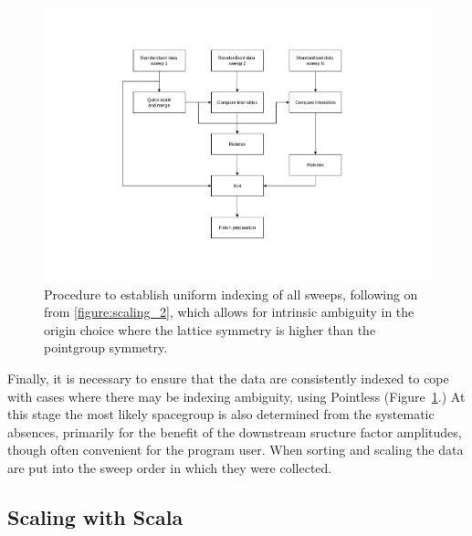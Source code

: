 \documentclass[preprint,pdf]{iucr}
\begin{document}
\begin{figure}
\caption{Procedure to establish uniform indexing of all sweeps,
following on from \ref{figure:scaling_2}, which allows for intrinsic
ambiguity in the origin choice where the lattice symmetry is higher
than the pointgroup symmetry.
\label{figure:scaling_3}}
\centering
\includegraphics[scale=0.5]{figures/scaling-step-3.pdf}
\end{figure}

Finally, it is necessary to ensure that the data are consistently
indexed to cope with cases where there may be indexing ambiguity,
using Pointless (Figure~\ref{figure:scaling_3}.) At this stage the
most likely
spacegroup is also determined from the systematic absences, primarily
for the benefit of the downstream sructure factor amplitudes, though
often convenient for the program user. When sorting and scaling the
data are put into the sweep order in which they were collected.

\subsection{Scaling with Scala}
\end{document}
